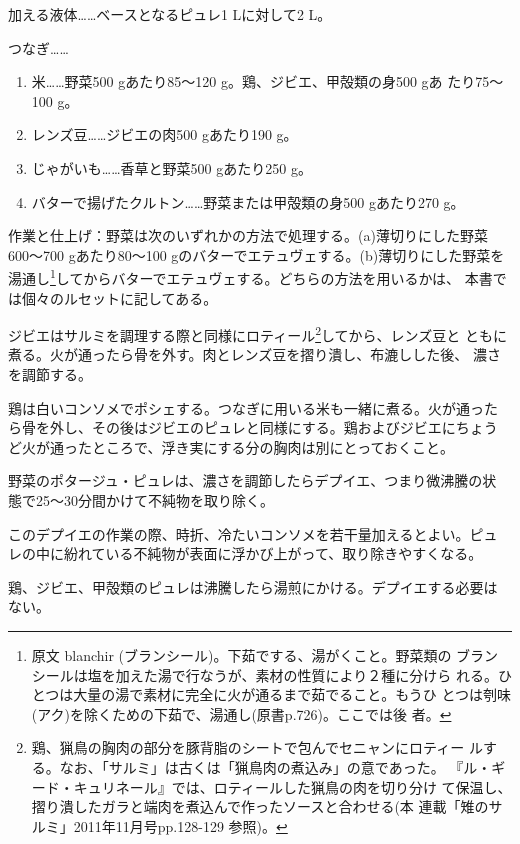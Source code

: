 加える液体\ldots{}\ldots{}ベースとなるピュレ1 Lに対して2 L。

つなぎ\ldots{}\ldots{}

\begin{enumerate}
\def\labelenumi{\arabic{enumi}.}
\item
  米\ldots{}\ldots{}野菜500 gあたり85〜120 g。鶏、ジビエ、甲殻類の身500
  gあ たり75〜100 g。
\item
  レンズ豆\ldots{}\ldots{}ジビエの肉500 gあたり190 g。
\item
  じゃがいも\ldots{}\ldots{}香草と野菜500 gあたり250 g。
\item
  バターで揚げたクルトン\ldots{}\ldots{}野菜または甲殻類の身500
  gあたり270 g。
\end{enumerate}

作業と仕上げ：野菜は次のいずれかの方法で処理する。(a)薄切りにした野菜
600〜700 gあたり80〜100 gのバターでエテュヴェする。(b)薄切りにした野菜を
湯通し\footnote{原文 blanchir
  (ブランシール)。下茹でする、湯がくこと。野菜類の
  ブランシールは塩を加えた湯で行なうが、素材の性質により２種に分けら
  れる。ひとつは大量の湯で素材に完全に火が通るまで茹でること。もうひ
  とつは刳味(アク)を除くための下茹で、湯通し(原書p.726)。ここでは後 者。}してからバターでエテュヴェする。どちらの方法を用いるかは、
本書では個々のルセットに記してある。

ジビエはサルミを調理する際と同様にロティール\footnote{鶏、猟鳥の胸肉の部分を豚背脂のシートで包んでセニャンにロティー
  ルする。なお、「サルミ」は古くは「猟鳥肉の煮込み」の意であった。
  『ル・ギード・キュリネール』では、ロティールした猟鳥の肉を切り分け
  て保温し、摺り潰したガラと端肉を煮込んで作ったソースと合わせる(本
  連載「雉のサルミ」2011年11月号pp.128-129 参照)。}してから、レンズ豆と
ともに煮る。火が通ったら骨を外す。肉とレンズ豆を摺り潰し、布漉しした後、
濃さを調節する。

鶏は白いコンソメでポシェする。つなぎに用いる米も一緒に煮る。火が通った
ら骨を外し、その後はジビエのピュレと同様にする。鶏およびジビエにちょう
ど火が通ったところで、浮き実にする分の胸肉は別にとっておくこと。

野菜のポタージュ・ピュレは、濃さを調節したらデプイエ、つまり微沸騰の状
態で25〜30分間かけて不純物を取り除く。

このデプイエの作業の際、時折、冷たいコンソメを若干量加えるとよい。ピュ
レの中に紛れている不純物が表面に浮かび上がって、取り除きやすくなる。

鶏、ジビエ、甲殻類のピュレは沸騰したら湯煎にかける。デプイエする必要は
ない。

